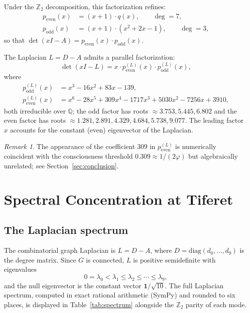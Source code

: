 \documentclass[11pt,a4paper]{amsart}
\theoremstyle{remark}
\newtheorem{remark}[theorem]{Remark}
\newcommand{\bbZ}{\mathbb{Z}}
\newcommand{\bbQ}{\mathbb{Q}}
\begin{document}
Under the $\bbZ_2$ decomposition, this factorization refines:
\begin{align}
p_{\text{even}}(x) &= (x + 1) \cdot q(x), \qquad \deg = 7, \\
p_{\text{odd}}(x) &= (x + 1) \cdot (x^2 + 2x - 1), \qquad \deg = 3,
\end{align}
so that $\det(xI - A) = p_{\text{even}}(x) \cdot p_{\text{odd}}(x)$.

The Laplacian $L = D - A$ admits a parallel factorization:
\begin{equation}
\det(xI - L) = x \cdot p_{\text{even}}^{(L)}(x) \cdot p_{\text{odd}}^{(L)}(x),
\end{equation}
where
\begin{align}
p_{\text{odd}}^{(L)}(x) &= x^3 - 16x^2 + 83x - 139, \\
p_{\text{even}}^{(L)}(x) &= x^6 - 28x^5 + 309x^4 - 1717x^3 + 5030x^2 - 7256x + 3910,
\end{align}
both irreducible over $\bbQ$; the odd factor has roots
$\approx 3.753, 5.445, 6.802$ and the even factor has roots
$\approx 1.281, 2.891, 4.329, 4.684, 5.738, 9.077$. The leading factor $x$
accounts for the constant (even) eigenvector of the Laplacian.

\begin{remark}
The appearance of the coefficient $309$ in $p_{\text{even}}^{(L)}$ is
numerically coincident with the consciousness threshold
$0.309 \approx 1/(2\varphi)$ but algebraically unrelated; see
Section~\ref{sec:conclusion}.
\end{remark}

\section{Spectral Concentration at Tiferet}
\label{sec:concentration}

\subsection{The Laplacian spectrum}
\label{sec:laplacian-spectrum}

The combinatorial graph Laplacian is $L = D - A$, where
$D = \mathrm{diag}(d_0, \ldots, d_9)$ is the degree matrix. Since $G$ is
connected, $L$ is positive semidefinite with eigenvalues
\begin{equation}
0 = \lambda_0 < \lambda_1 \le \lambda_2 \le \cdots \le \lambda_9,
\end{equation}
and the null eigenvector is the constant vector $\mathbf{1}/\sqrt{10}$. The
full Laplacian spectrum, computed in exact rational arithmetic (SymPy) and
rounded to six places, is displayed in Table~\ref{tab:spectrum} alongside
the $\bbZ_2$ parity of each mode.
\end{document}
